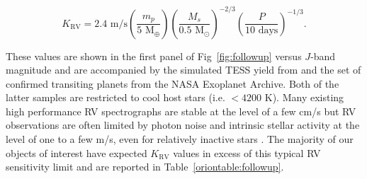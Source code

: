 \begin{equation}
  K_{\text{RV}} = 2.4 \text{ m/s} \left( \frac{m_p}{5 \text{ M}_{\oplus}} \right)
  \left( \frac{M_s}{0.5 \text{ M}_{\odot}} \right)^{-2/3} 
  \left( \frac{P}{10\text{ days}} \right)^{-1/3}.
\end{equation}

\noindent These values are shown in the first panel of Fig~\ref{fig:followup} versus $J$-band magnitude
and are accompanied by the simulated TESS yield from \cite{barclay18} and the set of
confirmed transiting planets from the NASA Exoplanet Archive.
Both of the latter samples are restricted to cool host stars (i.e. \teff{}
$<4200$ K). Many existing high performance RV spectrographs are stable at the level of a few cm/s but
RV observations are often limited by photon noise and intrinsic stellar activity at the level of one to a few
m/s, even for relatively inactive stars \citep{fischer16}. 
The majority of our objects of interest have expected $K_{\text{RV}}$ values in excess of this typical RV
sensitivity limit and are reported in Table~\ref{oriontable:followup}.  \\



